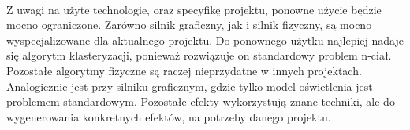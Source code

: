 \paragraph{}

Z uwagi na użyte technologie, oraz specyfikę projektu, ponowne użycie będzie mocno ograniczone. Zarówno silnik graficzny, jak i silnik fizyczny, są mocno wyspecjalizowane dla aktualnego projektu. Do ponownego użytku najlepiej nadaje się algorytm klasteryzacji, ponieważ rozwiązuje on standardowy problem n-ciał. Pozostałe algorytmy fizyczne są raczej nieprzydatne w innych projektach. Analogicznie jest przy silniku graficznym, gdzie tylko model oświetlenia jest problemem standardowym. Pozostałe efekty wykorzystują znane techniki, ale do wygenerowania konkretnych efektów, na potrzeby danego projektu.

